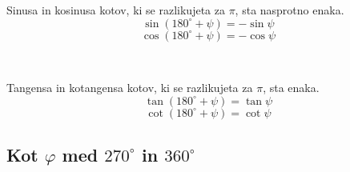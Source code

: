 \begin{multicols}{2}
\begin{figure}[H]
                    \end{figure}
                

                        
                            Sinusa in kosinusa kotov, ki se razlikujeta za $\pi$, sta nasprotno enaka. 
                            $$ \sin\left(180^\circ+\psi\right) = -\sin\psi $$
                            $$ \cos\left(180^\circ+\psi\right) = -\cos\psi $$
                        
                            ~
                        
                            Tangensa in kotangensa kotov, ki se razlikujeta za $\pi$, sta enaka.
                            $$ \tan\left(180^\circ+\psi\right) = \tan\psi $$
                            $$ \cot\left(180^\circ+\psi\right) = \cot\psi $$        
                              
        
                \end{multicols}


        


        
            \subsection*{Kot $\varphi$ med $270^\circ$ in $360^\circ$}
            
